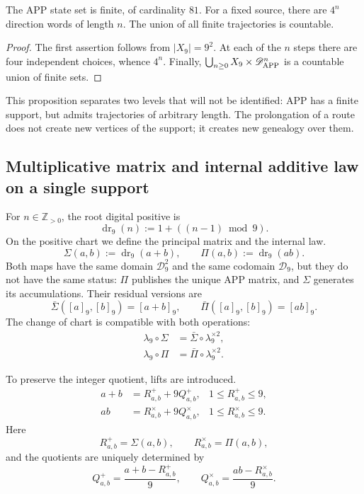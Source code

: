 \begin{proposition}
\label{p12-83-c1-s2:prop:app-soporte-finito-trayectorias-numerables}
The APP state set is finite, of cardinality \(81\). For a fixed source,
there are \(4^n\) direction words of length \(n\). The union
of all finite trajectories is countable.
\end{proposition}

\begin{proof}
The first assertion follows from \(|X_9|=9^2\). At each of the \(n\)
steps there are four independent choices, whence \(4^n\). Finally,
\(\bigcup_{n\geq0}X_9\times\mathscr D_{\rm APP}^n\) is a countable union
of finite sets.
\end{proof}

This proposition separates two levels that will not be identified: APP has a
finite support, but admits trajectories of arbitrary length. The
prolongation of a route does not create new vertices of the support; it creates new
genealogy over them.

\subsection{Multiplicative matrix and internal additive law on a single support}

For \(n\in\mathbb Z_{>0}\), the root digital positive is
\[
 \operatorname{dr}_9(n):=1+((n-1)\bmod9).
\]
On the positive chart we define the principal matrix and the internal law.
\[
 \Sigma(a,b):=\operatorname{dr}_9(a+b),
 \qquad
 \Pi(a,b):=\operatorname{dr}_9(ab).
\]
Both maps have the same domain \(\mathcal D_9^2\) and the same
codomain \(\mathcal D_9\), but they do not have the same status: \(\Pi\) publishes
the unique APP matrix, and \(\Sigma\) generates its accumulations. Their residual versions
are
\[
 \bar\Sigma([a]_9,[b]_9)=[a+b]_9,
 \qquad
 \bar\Pi([a]_9,[b]_9)=[ab]_9.
\]
The change of chart is compatible with both operations:
\begin{align*}
 \lambda_9\circ\Sigma
   &=\bar\Sigma\circ\lambda_9^{\times2},\\
 \lambda_9\circ\Pi
   &=\bar\Pi\circ\lambda_9^{\times2}.
\end{align*}

To preserve the integer quotient, lifts are introduced.
\begin{align}
 a+b &= R^+_{a,b}+9Q^+_{a,b},
 &1\leq R^+_{a,b}\leq9,
\label{p12-83-c1-s2:eq:app-lift-suma}\\
 ab &= R^\times_{a,b}+9Q^\times_{a,b},
 &1\leq R^\times_{a,b}\leq9.
\label{p12-83-c1-s2:eq:app-lift-producto}
\end{align}
Here
\[
 R^+_{a,b}=\Sigma(a,b),
 \qquad
 R^\times_{a,b}=\Pi(a,b),
\]
and the quotients are uniquely determined by
\[
 Q^+_{a,b}=\frac{a+b-R^+_{a,b}}9,
 \qquad
 Q^\times_{a,b}=\frac{ab-R^\times_{a,b}}9.
\]

